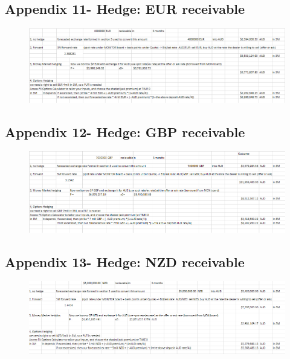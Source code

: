 \documentclass{article}
\let\Oldsubsection\subsection
\renewcommand{\subsection}{\FloatBarrier\Oldsubsection}
\begin{document}
\subsection*{Appendix 11- Hedge: EUR receivable}

\begin{figure}[h!]
    \centering
    \includegraphics[scale=0.5]{hedge/rec-EUR.png}
\end{figure}

\subsection*{Appendix 12- Hedge: GBP receivable}

\begin{figure}[h!]
    \centering
    \includegraphics[scale=0.5]{hedge/rec-GBP.png}
\end{figure}

\subsection*{Appendix 13- Hedge: NZD receivable}

\begin{figure}[h!]
    \centering
    \includegraphics[scale=0.5]{hedge/rec-NZD.png}
\end{figure}

\break
\end{document}
